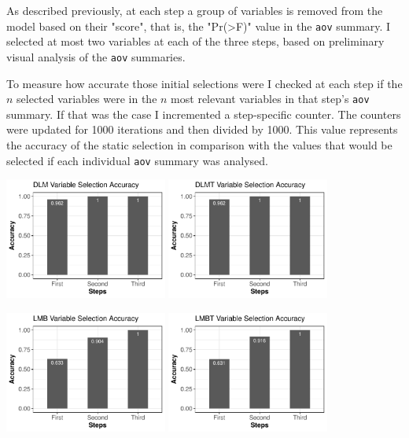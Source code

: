 \documentclass[final,12pt,a4paper]{article}
\begin{document}
As described previously, at each step a group of variables is removed from the
model based on their "score", that is, the "Pr(>F)" value in the \texttt{aov} summary.
I selected at most two variables at each of the three steps, based on preliminary
visual analysis of the \texttt{aov} summaries.

To measure how accurate those initial selections were I checked at each step if
the \(n\) selected variables were in the \(n\) most relevant variables in that
step's \texttt{aov} summary. If that was the case I incremented a step-specific
counter. The counters were updated for 1000 iterations and then divided by 1000.
This value represents the accuracy of the static selection in comparison with
the values that would be selected if each individual \texttt{aov} summary was analysed.

\begin{center}
\includegraphics[width=0.4\textwidth]{../img/doptaov_accuracy.pdf}
\includegraphics[width=0.4\textwidth]{../img/dlmt_accuracy.pdf}
\end{center}

\begin{center}
\includegraphics[width=0.4\textwidth]{../img/lmbm_accuracy.pdf}
\includegraphics[width=0.4\textwidth]{../img/lmbmt_accuracy.pdf}
\end{center}
\end{document}
